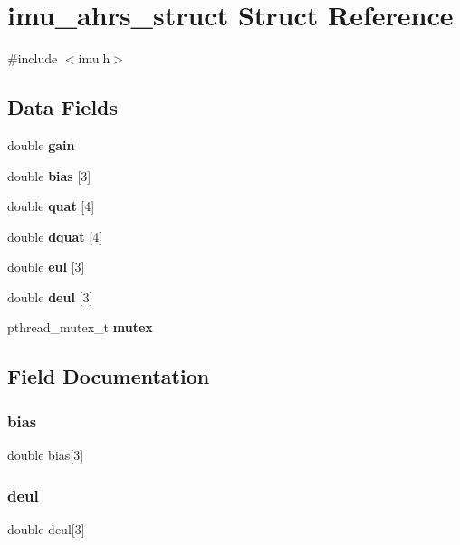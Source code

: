\section{imu\+\_\+ahrs\+\_\+struct Struct Reference}
\label{structimu__ahrs__struct}


{\ttfamily \#include $<$imu.\+h$>$}

\subsection*{Data Fields}
\begin{DoxyCompactItemize}
\item 
double \textbf{ gain}
\item 
double \textbf{ bias} [3]
\item 
double \textbf{ quat} [4]
\item 
double \textbf{ dquat} [4]
\item 
double \textbf{ eul} [3]
\item 
double \textbf{ deul} [3]
\item 
pthread\+\_\+mutex\+\_\+t \textbf{ mutex}
\end{DoxyCompactItemize}


\subsection{Field Documentation}
\mbox{\label{structimu__ahrs__struct_a446212d978f0d2c02e77bbdff710e6a5}} 
\subsubsection{bias}
{\footnotesize\ttfamily double bias[3]}

\mbox{\label{structimu__ahrs__struct_a028832c0dc5c07c8bd24c01c3dae2c82}} 
\subsubsection{deul}
{\footnotesize\ttfamily double deul[3]}

\mbox{\label{structimu__ahrs__struct_a3ab2fc1f32137e8ca1e1c9a98df14d5f}} 
